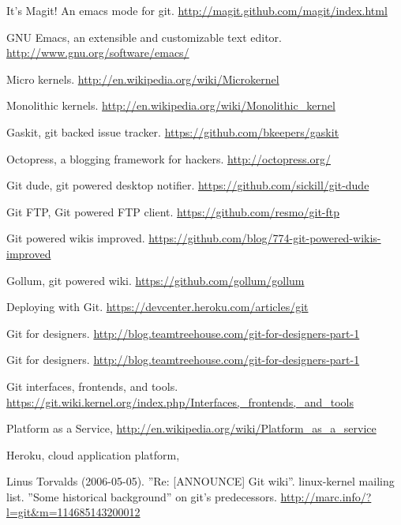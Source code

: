 \cleardoublepage
{}
{}
\begin{thebibliography}{99}

 It's Magit! An emacs mode for git.
  \url{ http://magit.github.com/magit/index.html}

 GNU Emacs, an extensible and customizable text editor.
  \url{http://www.gnu.org/software/emacs/}

 Micro kernels.
  \url{http://en.wikipedia.org/wiki/Microkernel}

 Monolithic kernels.
  \url{http://en.wikipedia.org/wiki/Monolithic_kernel}

 Gaskit, git backed issue tracker.
  \url{https://github.com/bkeepers/gaskit}

 Octopress, a blogging framework for hackers.
  \url{http://octopress.org/}

 Git dude, git powered desktop notifier.
  \url{https://github.com/sickill/git-dude}

 Git FTP, Git powered FTP client.
  \url{https://github.com/resmo/git-ftp}

 Git powered wikis improved.
  \url{https://github.com/blog/774-git-powered-wikis-improved}

 Gollum, git powered wiki.
  \url{https://github.com/gollum/gollum}

 Deploying with Git.
  \url{https://devcenter.heroku.com/articles/git}

 Git for designers.
  \url{http://blog.teamtreehouse.com/git-for-designers-part-1}

 Git for designers.
  \url{http://blog.teamtreehouse.com/git-for-designers-part-1}

 Git interfaces, frontends, and tools.
  \url{https://git.wiki.kernel.org/index.php/Interfaces,_frontends,_and_tools}

 Platform as a Service,
  \url{http://en.wikipedia.org/wiki/Platform_as_a_service}

 Heroku, cloud application platform,


 Linus Torvalds (2006-05-05). ”Re: [ANNOUNCE] Git
  wiki”. linux-kernel mailing list. ”Some historical background” on
  git’s predecessors. \url{http://marc.info/?l=git&m=114685143200012}


\end{thebibliography}
